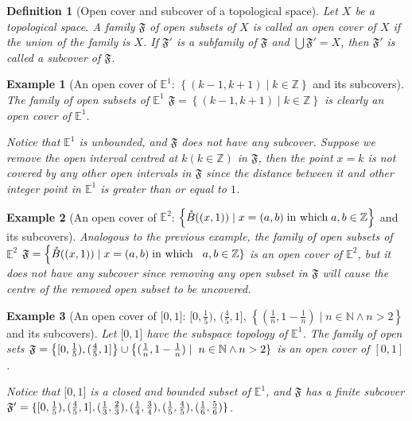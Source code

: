 \documentclass[onecolumn]{ctexart}
\newcommand*\textinmath[1]{\thickspace\textnormal{#1}\thickspace}
\newcommand*\interior[1]{\mathring{#1}}
\newtheorem{definition}{Definition}
\newtheorem{example}{Example}
\begin{document}
\begin{definition}[Open cover and subcover of a topological space]
  Let $X$ be a topological space. A family $\mathfrak{F}$ of open subsets of $X$ 
  is called an open cover of $X$ if the union of the family is $X$. If 
  $\mathfrak{F}'$ is a subfamily of $\mathfrak{F}$ and $\bigcup \mathfrak{F}' = 
  X$, then $\mathfrak{F}'$ is called a subcover of $\mathfrak{F}$.
\end{definition}

\begin{example}[An open cover of $\mathbb{E}^1$: $\left\{ (k - 1, k + 1) \mid k \in \mathbb{Z} \right\}$ and its subcovers]
  The family of open subsets of $\mathbb{E}^1$ $\mathfrak{F} = \left\{ (k - 1, 
  k + 1) \mid k \in \mathbb{Z} \right\}$ is clearly an open cover of $\mathbb{E}^1$.

  Notice that $\mathbb{E}^1$ is unbounded, and $\mathfrak{F}$ does not have any 
  subcover. Suppose we remove the open interval centred at $k (k \in \mathbb{Z})$ 
  in $\mathfrak{F}$, then the point $x = k$ is not covered by any other open 
  intervals in $\mathfrak{F}$ since the distance between it and other integer 
  point in $\mathbb{E}^1$ is greater than or equal to $1$.
\end{example}

\begin{example}[An open cover of $\mathbb{E}^2$: $\left\{ \interior{B}((x, 1)) \mid x = (a, b) \textinmath{in which} a, b \in \mathbb{Z} \right\}$ and its subcovers]
  Analogous to the previous example, the family of open subsets of $\mathbb{E}^2$ 
  $\mathfrak{F} = \left\{ \interior{B}((x, 1)) \mid x = (a, b) \textinmath{in which} 
  \right. \\ \left. a, b \in \mathbb{Z} \right\}$ is an open cover of $\mathbb{E}^2$, but it does 
  not have any subcover since removing any open subset in $\mathfrak{F}$ will 
  cause the centre of the removed open subset to be uncovered.
\end{example}

\begin{example}[An open cover of $\lbrack 0, 1 \rbrack$: $\lbrack 0, \frac{1}{5} \rparen$, $\lparen \frac{4}{5}, 1 \rbrack$, $\left\{ (\frac{1}{n}, 1 - \frac{1}{n}) \mid n \in \mathbb{N} \wedge n > 2 \right\}$ and its subcovers]
  Let $\lbrack 0, 1 \rbrack$ have the subspace topology of $\mathbb{E}^1$. The 
  family of open sets $\mathfrak{F} = \left\{ \lbrack 0, \frac{1}{5} \rparen, 
  \lparen \frac{4}{5}, 1 \rbrack \right\} \cup \left\{ (\frac{1}{n}, 1 - \frac{1}{n}) 
  \mid \right. \\ \left. n \in \mathbb{N} \wedge n > 2 \right\}$ is an open cover of $\left[ 0, 1 
  \right]$.

  Notice that $\lbrack 0, 1 \rbrack$ is a closed and bounded subset of $\mathbb{E}^1$, 
  and $\mathfrak{F}$ has a finite subcover $\mathfrak{F}' = \lbrace \lbrack 0, 
  \frac{1}{5} \rparen, \\ \lparen \frac{4}{5}, 1 \rbrack, (\frac{1}{3}, \frac{2}{3}), 
  (\frac{1}{4}, \frac{3}{4}), (\frac{1}{5}, \frac{4}{5}), (\frac{1}{6}, \frac{5}{6}) 
  \rbrace$.
\end{example}
\end{document}
